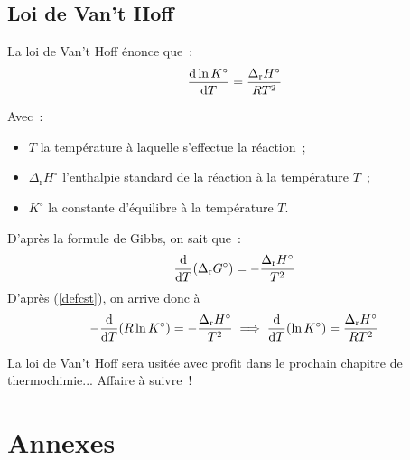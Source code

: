 \documentclass{article}
\let\oldref\ref
\renewcommand{\ref}[1]{(\oldref{#1})}
\newcommand{\Dr}{\Delta_{\mathrm{r}}}
\begin{document}
\subsection{Loi de Van't Hoff}
\begin{enonce}
    La loi de Van't Hoff énonce que~:
    $$\dv{\ln K^\circ}{T} = \frac{\Dr H^\circ}{RT^2}$$
\end{enonce}
Avec~:
\begin{itemize}
    \item $T$ la température  à laquelle s'effectue la réaction~;
    \item $\Dr H^\circ$ l'enthalpie standard de la réaction à la température $T$~;
    \item $K^\circ$ la constante d'équilibre à la température $T$.
\end{itemize}

\begin{tableau}
    D'après la formule de Gibbs, on sait que~:
    $$\dv{T}(\Dr G^\circ) = -\frac{\Dr H^\circ}{T^2}$$
    D'après \ref{defcst}, on arrive donc à
    $$-\dv{T}(R\ln K^\circ) =  -\frac{\Dr H^\circ}{T^2} \implies \dv{T}(\ln K^\circ) = \frac{\Dr H^\circ}{RT^2}$$
\end{tableau}

\begin{remarque}[Remarque]
    La loi de Van't Hoff sera usitée avec profit dans le prochain chapitre de thermochimie... Affaire à suivre~!
\end{remarque}

\section*{Annexes}
\end{document}
